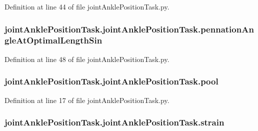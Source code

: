 Definition at line 44 of file joint\+Ankle\+Position\+Task.\+py.

\subsubsection[{\texorpdfstring{pennation\+Angle\+At\+Optimal\+Length\+Sin}{pennationAngleAtOptimalLengthSin}}]{\setlength{\rightskip}{0pt plus 5cm}joint\+Ankle\+Position\+Task.\+joint\+Ankle\+Position\+Task.\+pennation\+Angle\+At\+Optimal\+Length\+Sin}\hypertarget{classjoint_ankle_position_task_1_1joint_ankle_position_task_a0877e00f062b731c365508ff7d2a3d6a}{}\label{classjoint_ankle_position_task_1_1joint_ankle_position_task_a0877e00f062b731c365508ff7d2a3d6a}


Definition at line 48 of file joint\+Ankle\+Position\+Task.\+py.

\subsubsection[{\texorpdfstring{pool}{pool}}]{\setlength{\rightskip}{0pt plus 5cm}joint\+Ankle\+Position\+Task.\+joint\+Ankle\+Position\+Task.\+pool}\hypertarget{classjoint_ankle_position_task_1_1joint_ankle_position_task_aa8fb50eedd13b19ba31c9ddf38b8a32c}{}\label{classjoint_ankle_position_task_1_1joint_ankle_position_task_aa8fb50eedd13b19ba31c9ddf38b8a32c}


Definition at line 17 of file joint\+Ankle\+Position\+Task.\+py.

\subsubsection[{\texorpdfstring{strain}{strain}}]{\setlength{\rightskip}{0pt plus 5cm}joint\+Ankle\+Position\+Task.\+joint\+Ankle\+Position\+Task.\+strain}\hypertarget{classjoint_ankle_position_task_1_1joint_ankle_position_task_adfe86131966abb8ba9fadda94ce61270}{}\label{classjoint_ankle_position_task_1_1joint_ankle_position_task_adfe86131966abb8ba9fadda94ce61270}



